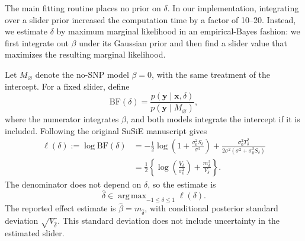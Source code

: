 \documentclass[11pt]{article}
\newcommand{\BF}{\mathrm{BF}}
\DeclareMathOperator*{\argmax}{arg\,max}
\begin{document}
The main fitting routine places no prior on $\delta$. In our
implementation, integrating over a slider prior increased the
computation time by a factor of 10--20. Instead, we estimate $\delta$
by maximum marginal likelihood in an empirical-Bayes fashion:
we first integrate out $\beta$ under its Gaussian prior and then
find a slider value that maximizes the resulting marginal likelihood.

Let $M_\varnothing$ denote the no-SNP model $\beta=0$, with the same
treatment of the intercept. For a fixed slider, define
\begin{equation}
\BF(\delta)
 =\frac{p(\mathbf y\mid\mathbf x,\delta)}
        {p(\mathbf y\mid M_\varnothing)},
\end{equation}
where the numerator integrates $\beta$, and both models integrate
the intercept if it is included. Following the original SuSiE manuscript gives
\begin{align}
\ell(\delta):=\log\BF(\delta)
 &=-\frac12\log\left(1+\frac{\sigma_0^2S_\delta}{\sigma^2}\right)
   +\frac{\sigma_0^2T_\delta^2}
    {2\sigma^2(\sigma^2+\sigma_0^2S_\delta)}
    \label{eq:logbf}\\
 &=\frac12\left\{\log\left(\frac{V_\delta}{\sigma_0^2}\right)
                   +\frac{m_\delta^2}{V_\delta}\right\}.
\end{align}
The denominator does not depend on $\delta$, so the estimate is
\begin{equation}
\widehat\delta
 \in\argmax_{-1\leq\delta\leq1}\ell(\delta).
\label{eq:delta-estimate}
\end{equation}
The reported effect estimate is $\widehat\beta=m_{\widehat\delta}$,
with conditional posterior standard deviation
$\sqrt{V_{\widehat\delta}}$. This standard deviation does not
include uncertainty in the estimated slider.
\end{document}
